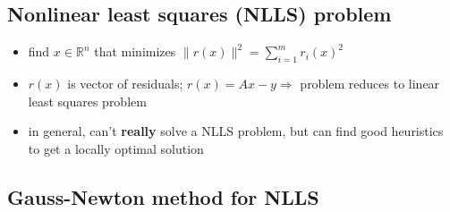 \documentclass[10pt,letterpaper]{article}
\begin{document}
\subsection{Nonlinear least squares (NLLS) problem}
\label{sec-6_5}

\begin{itemize}
\item find $x\in \mathbb{R}^{n}$ that minimizes $\displaystyle \| r(x) \| ^{2} = \sum ^{m} _{i=1} r _{i} (x) ^{2}$
\item $r(x)$ is vector of residuals; $r(x)= Ax-y \Rightarrow$ problem reduces to linear least squares problem
\item in general, can't \textbf{really} solve a NLLS problem, but can find good heuristics to get a locally optimal solution
\end{itemize}
\subsection{Gauss-Newton method for NLLS}
\label{sec-6_6}
\end{document}
